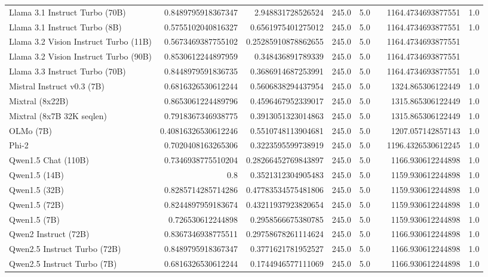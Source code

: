 \begin{table}[htp]
{\begin{tabular}{lrrrrrrr}
Llama 3.1 Instruct Turbo (70B) & 0.8489795918367347 & 2.948831728526524 & 245.0 & 5.0 &  & 1164.4734693877551 & 1.0 \\
Llama 3.1 Instruct Turbo (8B) & 0.5755102040816327 & 0.6561975401275012 & 245.0 & 5.0 &  & 1164.4734693877551 & 1.0 \\
Llama 3.2 Vision Instruct Turbo (11B) & 0.5673469387755102 & 0.25285910878862655 & 245.0 & 5.0 &  & 1164.4734693877551 &  \\
Llama 3.2 Vision Instruct Turbo (90B) & 0.8530612244897959 & 0.348436891789339 & 245.0 & 5.0 &  & 1164.4734693877551 &  \\
Llama 3.3 Instruct Turbo (70B) & 0.8448979591836735 & 0.3686914687253991 & 245.0 & 5.0 &  & 1164.4734693877551 & 1.0 \\
Mistral Instruct v0.3 (7B) & 0.6816326530612244 & 0.5606838294437954 & 245.0 & 5.0 &  & 1324.865306122449 & 1.0 \\
Mixtral (8x22B) & 0.8653061224489796 & 0.4596467952339017 & 245.0 & 5.0 &  & 1315.865306122449 & 1.0 \\
Mixtral (8x7B 32K seqlen) & 0.7918367346938775 & 0.3913051323014863 & 245.0 & 5.0 &  & 1315.865306122449 & 1.0 \\
OLMo (7B) & 0.40816326530612246 & 0.5510748113904681 & 245.0 & 5.0 &  & 1207.057142857143 & 1.0 \\
Phi-2 & 0.7020408163265306 & 0.3223595599738919 & 245.0 & 5.0 &  & 1196.4326530612245 & 1.0 \\
Qwen1.5 Chat (110B) & 0.7346938775510204 & 0.28266452769843897 & 245.0 & 5.0 &  & 1166.930612244898 & 1.0 \\
Qwen1.5 (14B) & 0.8 & 0.3521312304905483 & 245.0 & 5.0 &  & 1159.930612244898 & 1.0 \\
Qwen1.5 (32B) & 0.8285714285714286 & 0.47783534575481806 & 245.0 & 5.0 &  & 1159.930612244898 & 1.0 \\
Qwen1.5 (72B) & 0.8244897959183674 & 0.43211937923820654 & 245.0 & 5.0 &  & 1159.930612244898 & 1.0 \\
Qwen1.5 (7B) & 0.726530612244898 & 0.2958566675380785 & 245.0 & 5.0 &  & 1159.930612244898 & 1.0 \\
Qwen2 Instruct (72B) & 0.8367346938775511 & 0.29758678261114624 & 245.0 & 5.0 &  & 1166.930612244898 & 1.0 \\
Qwen2.5 Instruct Turbo (72B) & 0.8489795918367347 & 0.3771621781952527 & 245.0 & 5.0 &  & 1166.930612244898 & 1.0 \\
Qwen2.5 Instruct Turbo (7B) & 0.6816326530612244 & 0.1744946577111069 & 245.0 & 5.0 &  & 1166.930612244898 & 1.0 \\

\end{tabular}}
\end{table}
